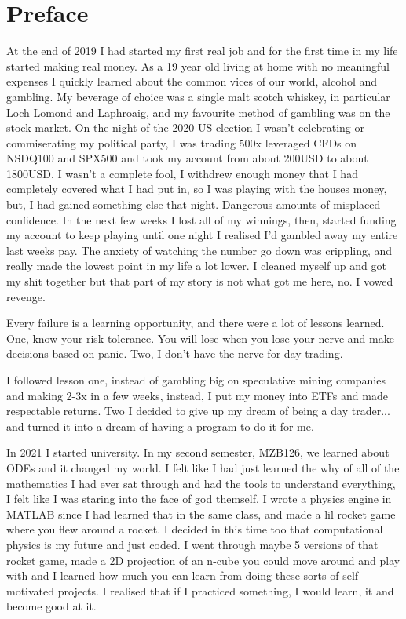 \maketitle

\frontmatter

\section*{Preface}

At the end of 2019 I had started my first real job and for the first time in my life started making real money. As a 19 year old living at home with no meaningful expenses I quickly learned about the common vices of our world, alcohol and gambling. My beverage of choice was a single malt scotch whiskey, in particular Loch Lomond and Laphroaig, and my favourite method of gambling was on the stock market. On the night of the 2020 US election I wasn't celebrating or commiserating my political party, I was trading 500x leveraged CFDs on NSDQ100 and SPX500 and took my account from about 200USD to about 1800USD. I wasn't a complete fool, I withdrew enough money that I had completely covered what I had put in, so I was playing with the houses money, but, I had gained something else that night. Dangerous amounts of misplaced confidence. In the next few weeks I lost all of my winnings, then, started funding my account to keep playing until one night I realised I'd gambled away my entire last weeks pay. The anxiety of watching the number go down was crippling, and really made the lowest point in my life a lot lower. I cleaned myself up and got my shit together but that part of my story is not what got me here, no. I vowed revenge. 

Every failure is a learning opportunity, and there were a lot of lessons learned. One, know your risk tolerance. You will lose when you lose your nerve and make decisions based on panic. Two, I don't have the nerve for day trading.

I followed lesson one, instead of gambling big on speculative mining companies and making 2-3x in a few weeks, instead, I put my money into ETFs and made respectable returns. Two I decided to give up my dream of being a day trader... and turned it into a dream of having a program to do it for me.

In 2021 I started university. In my second semester, MZB126, we learned about ODEs and it changed my world. I felt like I had just learned the why of all of the mathematics I had ever sat through and had the tools to understand everything, I felt like I was staring into the face of god themself. I wrote a physics engine in MATLAB since I had learned that in the same class, and made a lil rocket game where you flew around a rocket. I decided in this time too that computational physics is my future and just coded. I went through maybe 5 versions of that rocket game, made a 2D projection of an n-cube you could move around and play with and I learned how much you can learn from doing these sorts of self-motivated projects. I realised that if I practiced something, I would learn, it and become good at it.


